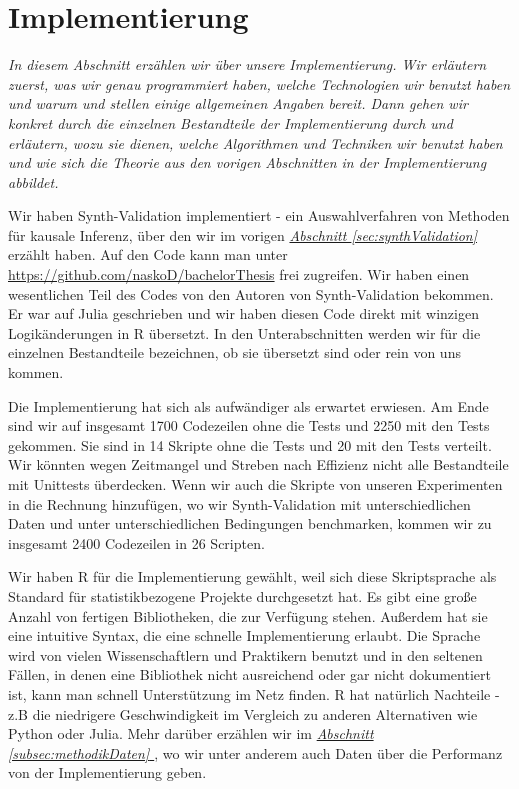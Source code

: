 \documentclass[12pt,a4paper,twoside]{scrartcl}
\numberwithin{equation}{section}
\newcommand{\refsec}[1]{\emph{\hyperref[#1]{Abschnitt \ref*{#1} }}}
\begin{document}
\section{Implementierung}\label{sec:implementierung}
\noindent
\emph{In diesem Abschnitt erzählen wir über unsere Implementierung. Wir erläutern zuerst, was wir genau programmiert haben, welche Technologien wir benutzt haben und warum und stellen einige allgemeinen Angaben bereit. Dann gehen wir konkret durch die einzelnen Bestandteile der Implementierung durch und erläutern, wozu sie dienen, welche Algorithmen und Techniken wir benutzt haben und wie sich die Theorie aus den vorigen Abschnitten in der Implementierung abbildet.}\par

Wir haben Synth-Validation\cite{schuler2017synth} implementiert - ein Auswahlverfahren von Methoden für kausale Inferenz, über den wir im vorigen \refsec{sec:synthValidation} erzählt haben. Auf den Code kann man unter \url{https://github.com/naskoD/bachelorThesis} frei zugreifen. Wir haben einen wesentlichen Teil des Codes von den Autoren von Synth-Validation bekommen. Er war auf Julia geschrieben und wir haben diesen Code direkt mit winzigen Logikänderungen in R übersetzt. In den Unterabschnitten werden wir für die einzelnen Bestandteile bezeichnen, ob sie übersetzt sind oder rein von uns kommen.\par 

\noindent
Die Implementierung hat sich als aufwändiger als erwartet erwiesen. Am Ende sind wir auf insgesamt 1700 Codezeilen ohne die Tests und 2250 mit den Tests gekommen. Sie sind in 14 Skripte ohne die Tests und 20 mit den Tests verteilt. Wir könnten wegen Zeitmangel und Streben nach Effizienz nicht alle Bestandteile mit Unittests überdecken. Wenn wir auch die Skripte von unseren Experimenten in die Rechnung hinzufügen, wo wir Synth-Validation mit unterschiedlichen Daten und unter unterschiedlichen Bedingungen benchmarken, kommen wir zu insgesamt 2400 Codezeilen in 26 Scripten.\par 

\noindent
Wir haben R für die Implementierung gewählt, weil sich diese Skriptsprache als Standard für statistikbezogene Projekte durchgesetzt hat. Es gibt eine große Anzahl von fertigen Bibliotheken, die zur Verfügung stehen. Außerdem hat sie eine intuitive Syntax, die eine schnelle Implementierung erlaubt. Die Sprache wird von vielen Wissenschaftlern und Praktikern benutzt und in den seltenen Fällen, in denen eine Bibliothek nicht ausreichend oder gar nicht dokumentiert ist, kann man schnell Unterstützung im Netz finden. R hat natürlich Nachteile -  z.B die niedrigere Geschwindigkeit im Vergleich zu anderen Alternativen wie Python oder Julia. Mehr darüber erzählen wir im \refsec{subsec:methodikDaten}, wo wir unter anderem auch Daten über die Performanz von der Implementierung geben.\par    
\end{document}
